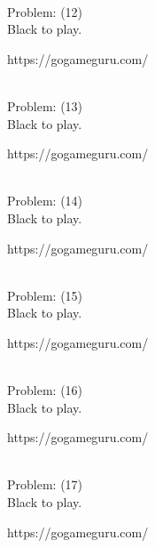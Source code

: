 \documentclass[11pt]{article}
\begin{document}
\begin{minipage}[t]{0.5\textwidth}
  {\centering
  
\\
Problem: (12)\\
Black to play.

https://gogameguru.com/\\
  }
\end{minipage}
\begin{minipage}[t]{0.5\textwidth}
  {\centering
  
\\
Problem: (13)\\
Black to play.

https://gogameguru.com/\\
  }
\end{minipage}
\begin{minipage}[t]{0.5\textwidth}
  {\centering
  
\\
Problem: (14)\\
Black to play.

https://gogameguru.com/\\
  }
\end{minipage}
\begin{minipage}[t]{0.5\textwidth}
  {\centering
  
\\
Problem: (15)\\
Black to play.

https://gogameguru.com/\\
  }
\end{minipage}
\begin{minipage}[t]{0.5\textwidth}
  {\centering
  
\\
Problem: (16)\\
Black to play.

https://gogameguru.com/\\
  }
\end{minipage}
\begin{minipage}[t]{0.5\textwidth}
  {\centering
  
\\
Problem: (17)\\
Black to play.

https://gogameguru.com/\\
  }
\end{minipage}
\end{document}
